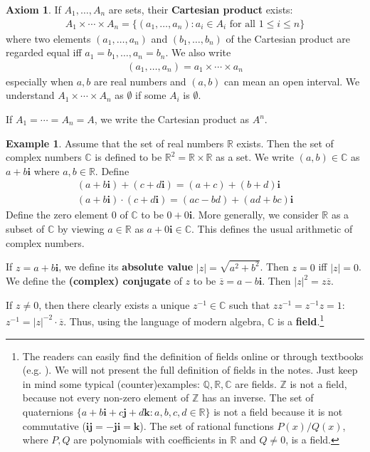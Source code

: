 \documentclass[12pt,b5paper,notitlepage]{article}
\theoremstyle{definition}
\newtheorem{eg}[df]{Example}
\newtheorem*{axiom}{Axiom}
\theoremstyle{plain}
\newcommand{\ovl}{\overline}
\newcommand{\im}{\mathbf{i}}
\newcommand{\Cbb}{\mathbb C}
\newcommand{\Zbb}{\mathbb Z}
\newcommand{\Qbb}{\mathbb Q}
\newcommand{\Rbb}{\mathbb R}
\numberwithin{equation}{section}
\begin{document}
\begin{axiom}
If $A_1,\dots,A_n$ are sets, their \textbf{Cartesian product} exists:
\begin{align*}
A_1\times\cdots\times A_n=\{(a_1,\dots,a_n): a_i\in A_i\text{ for all }1\leq i\leq n\}
\end{align*}
where two elements $(a_1,\dots,a_n)$ and $(b_1,\dots,b_n)$ of the Cartesian product are regarded equal iff $a_1=b_1,\dots,a_n=b_n$. We also write
\begin{align*}
(a_1,\dots,a_n)=a_1\times\cdots\times a_n
\end{align*}
especially when $a,b$ are real numbers and $(a,b)$ can mean an open interval. We understand $A_1\times\cdots\times A_n$ as $\emptyset$ if some $A_i$ is $\emptyset$.

If $A_1=\cdots=A_n=A$, we write the Cartesian product as $A^n$. \hfill\qedsymbol
\end{axiom}

\begin{eg}
Assume that the set of real numbers $\Rbb$ exists. Then the set of complex numbers $\Cbb$ \index{C@$\Cbb$, the set of complex numbers} is defined to be $\Rbb^2=\Rbb\times\Rbb$ as a set. We write $(a,b)\in\Cbb$ as $a+b\im$ where $a,b\in\Rbb$. Define
\begin{gather*}
(a+b\im)+(c+d\im)=(a+c)+(b+d)\im\\
(a+b\im)\cdot (c+d\im)=(ac-bd)+(ad+bc)\im
\end{gather*}
Define the zero element $0$ of $\Cbb$ to be $0+0\im$. More generally, we consider $\Rbb$ as a subset of $\Cbb$ by viewing $a\in\Rbb$ as $a+0\im\in\Cbb$. This defines the usual arithmetic of complex numbers. 

If $z=a+b\im$, we define its \textbf{absolute value} $|z|=\sqrt{a^2+b^2}$. Then $z=0$ iff $|z|=0$. We define the \textbf{(complex) conjugate} of $z$ to be $\ovl z=a-b\im$. Then $|z|^2=z\ovl z$.

If $z\neq 0$, then there clearly exists a unique $z^{-1}\in\Cbb$ such that $zz^{-1}=z^{-1}z=1$:  $z^{-1}=|z|^{-2}\cdot \ovl z$. Thus, using the language of modern algebra, $\Cbb$ is a  \textbf{field}.\footnote{The readers can easily find the definition of fields online or through textbooks (e.g. \cite[Def. 1.12]{Rud-P}). We will not present the full definition of fields in the notes. Just keep in mind some typical (counter)examples: $\Qbb,\Rbb,\Cbb$ are fields. $\Zbb$ is not a field, because not every non-zero element of $\Zbb$ has an inverse. The set of quaternions $\{a+b\im+c\mathbf{j}+d\mathbf{k}: a,b,c,d\in\Rbb\}$ is not a field because it is not commutative ($\im\mathbf{j}=-\mathbf{j}\im=\mathbf{k}$). The set of rational functions $P(x)/Q(x)$, where $P,Q$ are polynomials with coefficients in $\Rbb$ and $Q\neq 0$, is a field.}  \hfill\qedsymbol
\end{eg}
\end{document}

